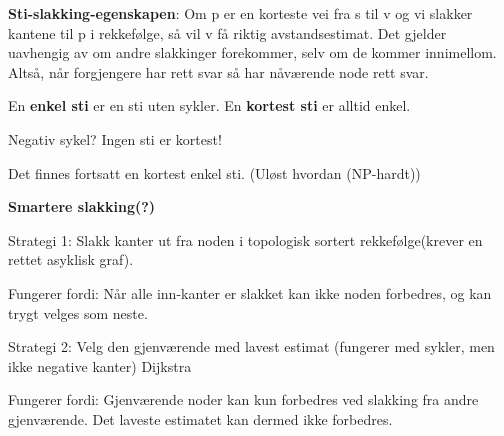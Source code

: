 \documentclass[12pt]{report}
\begin{document}
\vspace{\baselineskip}
\textbf{Sti-slakking-egenskapen}: Om p er en korteste vei fra s til v og vi slakker kantene til p i rekkefølge, så vil v få riktig avstandsestimat. Det gjelder uavhengig av om andre slakkinger forekommer, selv om de kommer innimellom. Altså, når forgjengere har rett svar så har nåværende node rett svar.\par

En \textbf{enkel sti} er en sti uten sykler. En \textbf{kortest sti} er alltid enkel.\par

Negativ sykel? Ingen sti er kortest!\par

	\item Det finnes fortsatt en kortest enkel sti. (Uløst hvordan (NP-hardt))\par


\vspace{\baselineskip}

\vspace{\baselineskip}

\vspace{\baselineskip}

\vspace{\baselineskip}

\vspace{\baselineskip}

\vspace{\baselineskip}

\vspace{\baselineskip}
\textbf{Smartere slakking(?)}\par

Strategi 1: Slakk kanter ut fra noden i topologisk sortert rekkefølge(krever en rettet asyklisk graf). \par

	\item Fungerer fordi: Når alle inn-kanter er slakket kan ikke noden forbedres, og kan trygt velges som neste.\par

Strategi 2: Velg den gjenværende med lavest estimat (fungerer med sykler, men ikke negative kanter)  Dijkstra\par

	\item Fungerer fordi: Gjenværende noder kan kun forbedres ved slakking fra andre gjenværende. Det laveste estimatet kan dermed ikke forbedres.\par
\end{document}
